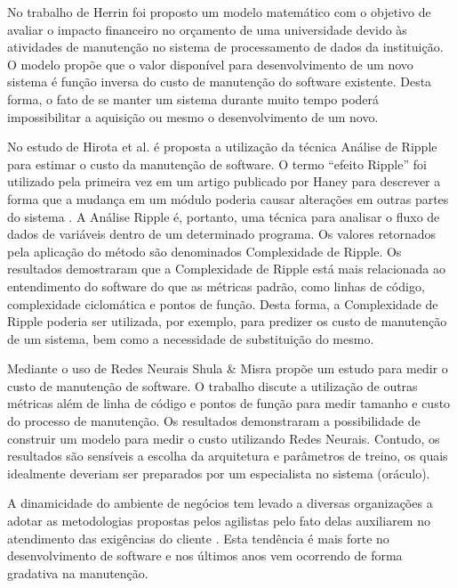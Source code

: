 \documentclass[msc,proposal,hidelot,hideabstract]{ppgccufmg} %
\begin{document}
No trabalho de Herrin \cite{Herrin:1985:SMC:323287.323383} foi proposto um modelo matemático com o
objetivo de avaliar o impacto financeiro no orçamento de uma universidade devido às atividades de manutenção no sistema de processamento de dados da instituição. O modelo propõe que o valor disponível para desenvolvimento de um novo sistema é função inversa do custo de manutenção do software existente. Desta forma, o fato de se manter um sistema durante muito tempo poderá impossibilitar a aquisição ou mesmo o desenvolvimento de um novo.

No estudo de Hirota et al. \cite{hirota1994approach} é proposta a utilização da técnica Análise de Ripple para estimar o custo da manutenção de software. O termo ``efeito Ripple'' foi utilizado pela primeira vez em um artigo publicado por Haney \cite{haney1972module} para descrever a forma que a mudança em um módulo poderia causar alterações em outras partes do sistema \cite{bilal2005using}. A Análise Ripple é, portanto, uma técnica para analisar o fluxo de dados de variáveis dentro de um determinado programa. Os valores retornados pela aplicação do método são denominados Complexidade de Ripple. Os resultados demostraram que a Complexidade de Ripple está mais relacionada ao entendimento do
software do que as métricas padrão, como linhas de código, complexidade ciclomática e pontos de função. Desta forma, a Complexidade de Ripple poderia ser utilizada, por exemplo, para predizer os custo de manutenção de um sistema, bem como a necessidade de substituição do mesmo.

Mediante o uso de Redes Neurais Shula \& Misra
\cite{Shukla:2008:ESM:1342211.1342232} propõe um estudo para medir o custo de
manutenção de software. O trabalho discute a utilização de outras métricas além
de linha de código e pontos de função para medir  tamanho e custo do processo de manutenção. Os resultados demonstraram a possibilidade de construir um modelo para medir o custo utilizando Redes Neurais. Contudo, os resultados são sensíveis a escolha da arquitetura e parâmetros de treino, os quais idealmente deveriam ser preparados por um especialista no sistema (oráculo).


A dinamicidade do ambiente de negócios tem levado a diversas organizações a adotar as metodologias propostas pelos agilistas pelo fato delas auxiliarem no atendimento das exigências do cliente \cite{Devulapally2015}. Esta tendência é mais forte no desenvolvimento de software e nos últimos anos vem ocorrendo de forma gradativa na manutenção. 
\end{document}

